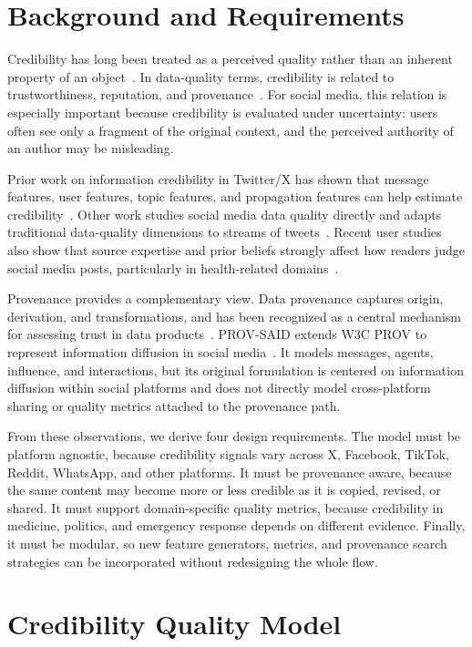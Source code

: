 \documentclass[sigconf, nonacm]{acmart}
\begin{document}
\section{Background and Requirements}

Credibility has long been treated as a perceived quality rather than an inherent
property of an object~\cite{FoggTseng1999}. In data-quality terms, credibility is
related to trustworthiness, reputation, and provenance~\cite{BatiniScannapieco2016}.
For social media, this relation is especially important because credibility is
evaluated under uncertainty: users often see only a fragment of the original
context, and the perceived authority of an author may be misleading.

Prior work on information credibility in Twitter/X has shown that message
features, user features, topic features, and propagation features can help
estimate credibility~\cite{Castillo2011}. Other work studies social media data
quality directly and adapts traditional data-quality dimensions to streams of
tweets~\cite{Arolfo2020}. Recent user studies also show that source expertise and
prior beliefs strongly affect how readers judge social media posts, particularly
in health-related domains~\cite{Kuutila2024}.

Provenance provides a complementary view. Data provenance captures origin,
derivation, and transformations, and has been recognized as a central mechanism
for assessing trust in data products~\cite{Simmhan2005}. PROV-SAID extends W3C
PROV to represent information diffusion in social media~\cite{Taxidou2015}. It
models messages, agents, influence, and interactions, but its original formulation
is centered on information diffusion within social platforms and does not directly
model cross-platform sharing or quality metrics attached to the provenance path.

From these observations, we derive four design requirements. The model must be
platform agnostic, because credibility signals vary across X, Facebook, TikTok,
Reddit, WhatsApp, and other platforms. It must be provenance aware, because the
same content may become more or less credible as it is copied, revised, or shared.
It must support domain-specific quality metrics, because credibility in medicine,
politics, and emergency response depends on different evidence. Finally, it must
be modular, so new feature generators, metrics, and provenance search strategies
can be incorporated without redesigning the whole flow.

\section{Credibility Quality Model}
\end{document}
